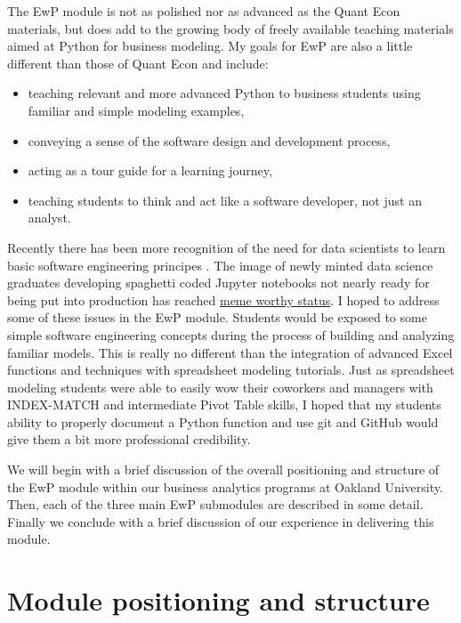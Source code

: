 \documentclass[ited]{informs3}                      %
\begin{document}
The EwP module is not as polished nor as advanced as the Quant Econ materials, but does add to the growing body of freely available teaching materials aimed at Python for business modeling. My goals for EwP are also a little different than those of Quant Econ and include:

\begin{itemize}
	\item teaching relevant and more advanced Python to business students using familiar and simple modeling examples,
	\item conveying a sense of the software design and development process,
	\item acting as a tour guide for a learning journey,
	\item teaching students to think and act like a software developer, not just an analyst.
\end{itemize}

Recently there has been more recognition of the need for data scientists to learn basic software engineering principes \citep{nelsonSoftwareEngineeringData2024,treadwaySoftwareEngineeringData2023,rodriguesBuildingReproducibleAnalytical2023}.  The image of newly minted data science graduates developing spaghetti coded Jupyter notebooks not nearly ready for being put into production has reached \href{https://www.reddit.com/r/ProgrammerHumor/comments/y2xe3n/like_every_time_ever_when_the_devops_engineer/}{meme worthy status}. I hoped to address some of these issues in the EwP module. Students would be exposed to some simple software engineering concepts during the process of building and analyzing familiar models. This is really no different than the integration of advanced Excel functions and techniques with spreadsheet modeling tutorials. Just as spreadsheet modeling students were able to easily wow their coworkers and managers with INDEX-MATCH and intermediate Pivot Table skills, I hoped that my students ability to properly document a Python function and use git and GitHub would give them a bit more professional credibility.

We will begin with a brief discussion of the overall positioning and structure of the EwP module within our business analytics programs at Oakland University. Then, each of the three main EwP submodules are described in some detail. Finally we conclude with a brief discussion of our experience in delivering this module.

\section{Module positioning and structure}
\end{document}
